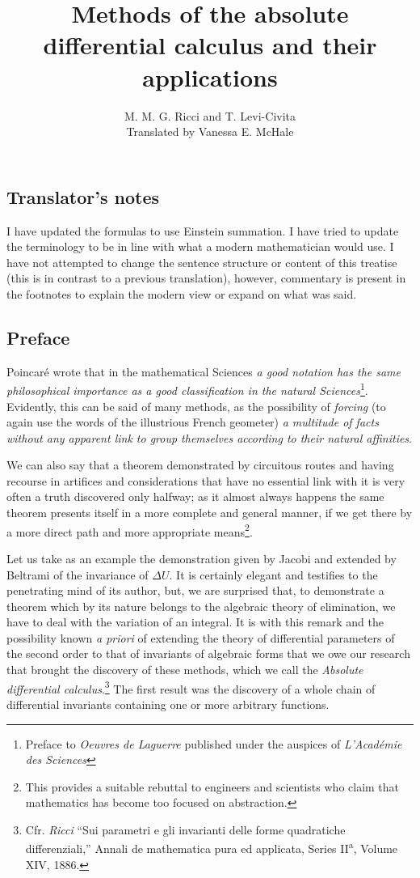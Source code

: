 \documentclass{book}
\begin{document}
\title{Methods of the absolute differential calculus and their applications}
\author{M. M. G. Ricci and T. Levi-Civita\\
Translated by Vanessa E. McHale}
\date{}
\maketitle
\tableofcontents
\subsection*{Translator's notes}
I have updated the formulas to use Einstein summation. I have tried to update the terminology to be in line with what a modern mathematician would use. I have not attempted to change the sentence structure or content of this treatise (this is in contrast to a previous translation), however, commentary is present in the footnotes to explain the modern view or expand on what was said.
\subsection*{Preface}
Poincar\'{e} wrote that in the mathematical Sciences \emph{a good notation has the same philosophical importance as a good classification in the natural Sciences}\footnote{Preface to \emph{Oeuvres de Laguerre} published under the auspices of \emph{L'Acad\'{e}mie des Sciences}}. Evidently, this can be said of many methods, as the possibility of \emph{forcing} (to again use the words of the illustrious French geometer) \emph{a multitude of facts without any apparent link to group themselves according to their natural affinities}.

We can also say that a theorem demonstrated by circuitous routes and having recourse in artifices and considerations that have no essential link with it is very often a truth discovered only halfway; as it almost always happens the same theorem presents itself in a more complete and general manner, if we get there by a more direct path and more appropriate means\footnote{This provides a suitable rebuttal to engineers and scientists who claim that mathematics has become too focused on abstraction.}.

Let us take as an example the demonstration given by Jacobi and extended by Beltrami of the invariance of $\Delta U$. It is certainly elegant and testifies to the penetrating mind of its author, but, we are surprised that, to demonstrate a theorem which by its nature belongs to the algebraic theory of elimination, we have to deal with the variation of an integral. It is with this remark and the possibility known \emph{a priori} of extending the theory of differential parameters of the second order to that of invariants of algebraic forms that we owe our research that brought the discovery of these methods, which we call the \emph{Absolute differential calculus}.\footnote{Cfr. \emph{Ricci} ``Sui parametri e gli invarianti delle forme quadratiche differenziali,'' Annali de mathematica pura ed applicata, Series II\textsuperscript{a}, Volume XIV, 1886.} The first result was the discovery of a whole chain of differential invariants containing one or more arbitrary functions.
\end{document}

